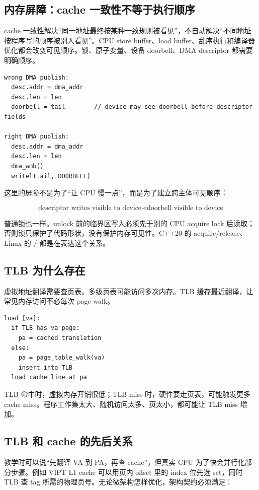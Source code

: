\subsection{内存屏障：cache 一致性不等于执行顺序}

cache 一致性解决“同一地址最终按某种一致规则被看见”，不自动解决“不同地址按程序写的顺序被别人看见”。CPU store buffer、load buffer、乱序执行和编译器优化都会改变可见顺序。锁、原子变量、设备 doorbell、DMA descriptor 都需要明确顺序。

\begin{lstlisting}
wrong DMA publish:
  desc.addr = dma_addr
  desc.len = len
  doorbell = tail        // device may see doorbell before descriptor fields

right DMA publish:
  desc.addr = dma_addr
  desc.len = len
  dma_wmb()
  writel(tail, DOORBELL)
\end{lstlisting}

这里的屏障不是为了“让 CPU 慢一点”，而是为了建立跨主体可见顺序：

\[
\text{descriptor writes visible to device}
\prec
\text{doorbell visible to device}
\]

普通锁也一样。unlock 前的临界区写入必须先于别的 CPU acquire lock 后读取；否则锁只保护了代码形状，没有保护内存可见性。C++20 的 acquire/release、Linux 的 / 都是在表达这个关系。

\subsection{TLB 为什么存在}

虚拟地址翻译需要查页表。多级页表可能访问多次内存。TLB 缓存最近翻译，让常见内存访问不必每次 page walk。

\begin{lstlisting}
load [va]:
  if TLB has va page:
    pa = cached translation
  else:
    pa = page_table_walk(va)
    insert into TLB
  load cache line at pa
\end{lstlisting}

TLB 命中时，虚拟内存开销很低；TLB miss 时，硬件要走页表，可能触发更多 cache miss。程序工作集太大、随机访问太多、页太小，都可能让 TLB miss 增加。

\subsection{TLB 和 cache 的先后关系}

教学时可以说“先翻译 VA 到 PA，再查 cache”，但真实 CPU 为了快会并行化部分步骤。例如 VIPT L1 cache 可以用页内 offset 里的 index 位先选 set，同时 TLB 查 tag 所需的物理页号。无论微架构怎样优化，架构契约必须满足：

